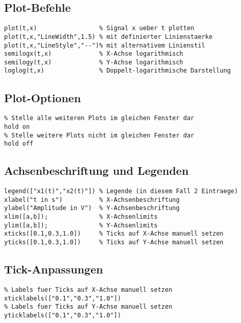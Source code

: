 \documentclass[threecolumn, 5pt, german]{latex4ei/latex4ei_sheet}
\begin{document}
	\begin{sectionbox}
	
		\subsection{Plot-Befehle}
		
		\begin{lstlisting}
plot(t,x)                 % Signal x ueber t plotten
plot(t,x,"LineWidth",1.5) % mit definierter Linienstaerke
plot(t,x,"LineStyle","--")% mit alternativem Linienstil
semilogx(t,x)             % X-Achse logarithmisch
semilogy(t,x)             % Y-Achse logarithmisch
loglog(t,x)               % Doppelt-logarithmische Darstellung
		\end{lstlisting}
	\end{sectionbox}
	
	\begin{sectionbox}
	
		\subsection{Plot-Optionen}
		
		\begin{lstlisting}
% Stelle alle weiteren Plots im gleichen Fenster dar
hold on
% Stelle weitere Plots nicht im gleichen Fenster dar
hold off
		\end{lstlisting}
	\end{sectionbox}
	
	\begin{sectionbox}
	
		\subsection{Achsenbeschriftung und Legenden}
		
		\begin{lstlisting}
legend(["x1(t)","x2(t)"]) % Legende (in diesem Fall 2 Eintraege)
xlabel("t in s")          % X-Achsenbeschriftung
ylabel("Amplitude in V")  % Y-Achsenbeschriftung
xlim([a,b]);              % X-Achsenlimits
ylim([a,b]);              % Y-Achsenlimits
xticks([0.1,0.3,1.0])     % Ticks auf X-Achse manuell setzen
yticks([0.1,0.3,1.0])     % Ticks auf Y-Achse manuell setzen
		\end{lstlisting}
	\end{sectionbox}
	
	\begin{sectionbox}
	
		\subsection{Tick-Anpassungen}
		
		\begin{lstlisting}
% Labels fuer Ticks auf X-Achse manuell setzen
xticklabels(["0.1","0.3","1.0"])
% Labels fuer Ticks auf Y-Achse manuell setzen
yticklabels(["0.1","0.3","1.0"])
		\end{lstlisting}
	\end{sectionbox}
	
\end{document}
